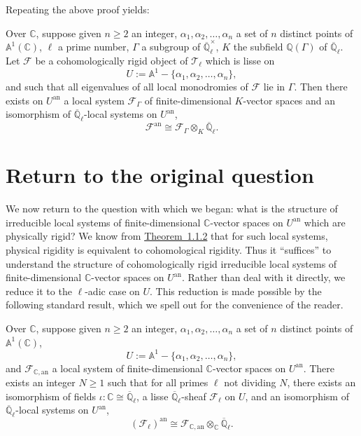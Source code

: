 Repeating the above proof yields:

Over \(\mathbb{C}\), suppose given \(n\geq 2\) an integer,
\(\alpha_1,\alpha_2,\ldots,\alpha_n\) a set of \(n\) distinct points of
\(\mathbb{A}^1(\mathbb{C})\), \(\ell\) a prime number, \(\Gamma\) a subgroup
of \(\overline{\mathbb{Q}}_\ell^\times\), \(K\) the subfield
\(\mathbb{Q}(\Gamma)\) of \(\overline{\mathbb{Q}}_\ell\). Let \(\mathcal{F}\)
be a cohomologically rigid object of \(\mathcal{T}_\ell\) which is lisse on
\[
  U:=\mathbb{A}^1-\{\alpha_1,\alpha_2,\ldots,\alpha_n\},
\]
and such that all eigenvalues of all local monodromies of \(\mathcal{F}\) lie
in \(\Gamma\). Then there exists on \(U^{\mathrm{an}}\) a local system
\(\mathcal{F}_{\Gamma}\) of finite-dimensional \(K\)-vector spaces and an
isomorphism of \(\overline{\mathbb{Q}}_\ell\)-local systems on
\(U^{\mathrm{an}}\),
\[
  \mathcal{F}^{\mathrm{an}}\cong
  \mathcal{F}_{\Gamma}\otimes_K\overline{\mathbb{Q}}_\ell.
\]

\section{Return to the original question}\label{sec:5.9}

We now return to the question with which we began: what is the structure of
irreducible local systems of finite-dimensional \(\mathbb{C}\)-vector spaces
on \(U^{\mathrm{an}}\) which are physically rigid? We know from
\hyperref[thm:1.1.2]{Theorem~1.1.2} that for such local systems, physical
rigidity is equivalent to cohomological rigidity. Thus it ``suffices'' to
understand the structure of cohomologically rigid irreducible local systems of
finite-dimensional \(\mathbb{C}\)-vector spaces on \(U^{\mathrm{an}}\). Rather
than deal with it directly, we reduce it to the \(\ell\)-adic case on \(U\).
This reduction is made possible by the following standard result, which we
spell out for the convenience of the reader.

Over \(\mathbb{C}\), suppose given \(n\geq 2\) an integer,
\(\alpha_1,\alpha_2,\ldots,\alpha_n\) a set of \(n\) distinct points of
\(\mathbb{A}^1(\mathbb{C})\),
\[
  U:=\mathbb{A}^1-\{\alpha_1,\alpha_2,\ldots,\alpha_n\},
\]
and \(\mathcal{F}_{\mathbb{C},\mathrm{an}}\) a local system of
finite-dimensional \(\mathbb{C}\)-vector spaces on \(U^{\mathrm{an}}\). There
exists an integer \(N\geq 1\) such that for all primes \(\ell\) not dividing
\(N\), there exists an isomorphism of fields
\(\iota:\mathbb{C}\cong\overline{\mathbb{Q}}_\ell\), a lisse
\(\overline{\mathbb{Q}}_\ell\)-sheaf \(\mathcal{F}_\ell\) on \(U\), and an
isomorphism of \(\overline{\mathbb{Q}}_\ell\)-local systems on
\(U^{\mathrm{an}}\),
\[
  (\mathcal{F}_\ell)^{\mathrm{an}}\cong
  \mathcal{F}_{\mathbb{C},\mathrm{an}}\otimes_{\mathbb{C}}
  \overline{\mathbb{Q}}_\ell.
\]


